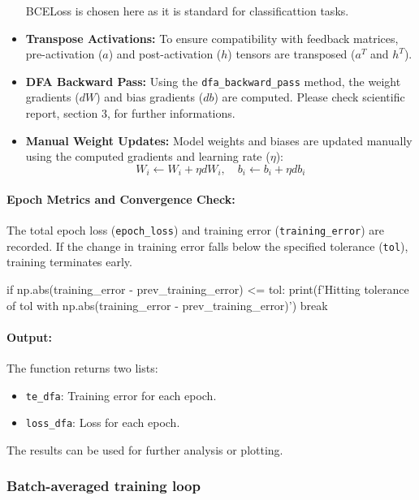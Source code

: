 \documentclass[english]{article}
\begin{document}
\begin{itemize}
    BCELoss is chosen here as it is standard for classificattion tasks.

    \item \textbf{Transpose Activations:}
    To ensure compatibility with feedback matrices, pre-activation (\(a\)) and post-activation (\(h\)) tensors are transposed (\(a^T\) and \(h^T\)).

    \item \textbf{DFA Backward Pass:}
    Using the \texttt{dfa\_backward\_pass} method, the weight gradients (\(dW\)) and bias gradients (\(db\)) are computed. Please check scientific report, section 3, for further informations.

    \item \textbf{Manual Weight Updates:}
    Model weights and biases are updated manually using the computed gradients and learning rate (\(\eta\)):
    \[
    W_i \leftarrow W_i + \eta dW_i, \quad b_i \leftarrow b_i + \eta db_i
    \]
\end{itemize}

\paragraph{Epoch Metrics and Convergence Check:}
The total epoch loss (\texttt{epoch\_loss}) and training error (\texttt{training\_error}) are recorded. If the change in training error falls below the specified tolerance (\texttt{tol}), training terminates early.

\begin{python}
if np.abs(training_error - prev_training_error) <= tol:
    print(f'Hitting tolerance of {tol} with {np.abs(training_error - prev_training_error)}')
    break
\end{python}

\paragraph{Output:}
The function returns two lists:
\begin{itemize}
    \item \texttt{te\_dfa}: Training error for each epoch.
    \item \texttt{loss\_dfa}: Loss for each epoch.
\end{itemize}
The results can be used for further analysis or plotting.






\subsubsection{Batch-averaged training loop}
\end{document}
